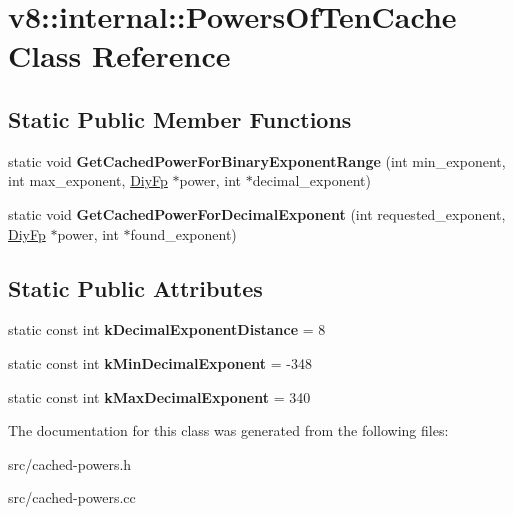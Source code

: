 \hypertarget{classv8_1_1internal_1_1_powers_of_ten_cache}{}\section{v8\+:\+:internal\+:\+:Powers\+Of\+Ten\+Cache Class Reference}
\label{classv8_1_1internal_1_1_powers_of_ten_cache}
\subsection*{Static Public Member Functions}
\begin{DoxyCompactItemize}
\item 
\hypertarget{classv8_1_1internal_1_1_powers_of_ten_cache_a6540b66a9cbfa1a641495b4210e48980}{}static void {\bfseries Get\+Cached\+Power\+For\+Binary\+Exponent\+Range} (int min\+\_\+exponent, int max\+\_\+exponent, \hyperlink{classv8_1_1internal_1_1_diy_fp}{Diy\+Fp} $\ast$power, int $\ast$decimal\+\_\+exponent)\label{classv8_1_1internal_1_1_powers_of_ten_cache_a6540b66a9cbfa1a641495b4210e48980}

\item 
\hypertarget{classv8_1_1internal_1_1_powers_of_ten_cache_ab5f115d74ae1d59957740e6b32e7be35}{}static void {\bfseries Get\+Cached\+Power\+For\+Decimal\+Exponent} (int requested\+\_\+exponent, \hyperlink{classv8_1_1internal_1_1_diy_fp}{Diy\+Fp} $\ast$power, int $\ast$found\+\_\+exponent)\label{classv8_1_1internal_1_1_powers_of_ten_cache_ab5f115d74ae1d59957740e6b32e7be35}

\end{DoxyCompactItemize}
\subsection*{Static Public Attributes}
\begin{DoxyCompactItemize}
\item 
\hypertarget{classv8_1_1internal_1_1_powers_of_ten_cache_a329c4f9bb31d4843a1c78de73c1b46a2}{}static const int {\bfseries k\+Decimal\+Exponent\+Distance} = 8\label{classv8_1_1internal_1_1_powers_of_ten_cache_a329c4f9bb31d4843a1c78de73c1b46a2}

\item 
\hypertarget{classv8_1_1internal_1_1_powers_of_ten_cache_a0da8d97277aecd957197313bb1e9cc63}{}static const int {\bfseries k\+Min\+Decimal\+Exponent} = -\/348\label{classv8_1_1internal_1_1_powers_of_ten_cache_a0da8d97277aecd957197313bb1e9cc63}

\item 
\hypertarget{classv8_1_1internal_1_1_powers_of_ten_cache_a5e7db658341c32ff29a88f3b893ad20e}{}static const int {\bfseries k\+Max\+Decimal\+Exponent} = 340\label{classv8_1_1internal_1_1_powers_of_ten_cache_a5e7db658341c32ff29a88f3b893ad20e}

\end{DoxyCompactItemize}


The documentation for this class was generated from the following files\+:\begin{DoxyCompactItemize}
\item 
src/cached-\/powers.\+h\item 
src/cached-\/powers.\+cc\end{DoxyCompactItemize}
